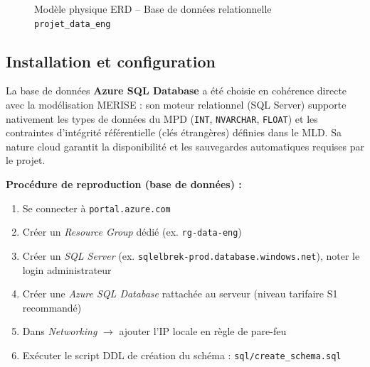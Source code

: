 \documentclass[12pt,a4paper]{article}
\begin{document}
\begin{figure}[H]
{
}
\caption{Modèle physique ERD -- Base de données relationnelle \texttt{projet\_data\_eng}}
\end{figure}


\subsection{Installation et configuration}

La base de données \textbf{Azure SQL Database} a été choisie en cohérence directe avec la modélisation MERISE : son moteur relationnel (SQL Server) supporte nativement les types de données du MPD (\texttt{INT}, \texttt{NVARCHAR}, \texttt{FLOAT}) et les contraintes d'intégrité référentielle (clés étrangères) définies dans le MLD. Sa nature cloud garantit la disponibilité et les sauvegardes automatiques requises par le projet.

\textbf{Procédure de reproduction (base de données) :}
\begin{enumerate}
  \item Se connecter à \texttt{portal.azure.com}
  \item Créer un \textit{Resource Group} dédié (ex. \texttt{rg-data-eng})
  \item Créer un \textit{SQL Server} (ex. \texttt{sqlelbrek-prod.database.windows.net}), noter le login administrateur
  \item Créer une \textit{Azure SQL Database} rattachée au serveur (niveau tarifaire S1 recommandé)
  \item Dans \textit{Networking} $\to$ ajouter l'IP locale en règle de pare-feu
  \item Exécuter le script DDL de création du schéma : \texttt{sql/create\_schema.sql}
\end{enumerate}
\end{document}
